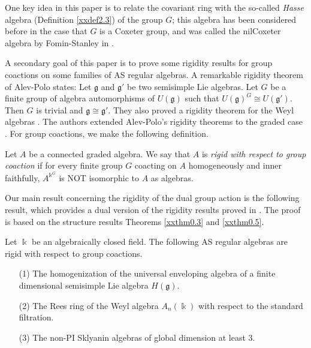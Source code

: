  One key idea in this paper is to relate
the covariant ring with the so-called {\it Hasse} algebra (Definition \ref{xxdef2.3})
of the group $G$; this algebra has been considered before in the case that $G$ is a Coxeter group, and was called the nilCoxeter algebra by Fomin-Stanley in \cite{FS}. 

A secondary goal of this paper is to prove some rigidity results
for group coactions on some families of AS regular 
algebras. A remarkable rigidity theorem of Alev-Polo \cite[Theorem 1]{AP}
states:
Let ${\mathfrak g}$ and ${\mathfrak g}'$ be two semisimple Lie algebras. Let $G$ be 
a finite group of algebra automorphisms of $U({\mathfrak g})$ such that 
$U({\mathfrak g})^G \cong  U({\mathfrak g}')$. Then $G$ is trivial and 
${\mathfrak g} \cong {\mathfrak g}'$.
They also proved a rigidity theorem for the Weyl algebras
\cite[Theorem 2]{AP}.
The authors extended Alev-Polo's rigidity theorems to the 
graded case \cite[Theorem 0.2 and Corollary 0.4]{KKZ1}. 
For group coactions, we make the following definition.

\begin{definition}
\label{xxdef0.8}
Let $A$ be a connected graded algebra. We say that $A$ is 
{\it rigid with respect to group coaction} if for every 
finite group $G$ coacting on $A$ homogeneously and inner
faithfully, $A^{\Bbbk^G}$ is NOT isomorphic to $A$ as algebras.
\end{definition}

Our main result concerning the rigidity of the dual group action is the following result, which provides
a dual version of the rigidity results proved in 
\cite[Theorem 0.2 and Corollary 0.4]{KKZ1}. The proof is based on the 
structure results Theorems \ref{xxthm0.3} and \ref{xxthm0.5}.

\begin{theorem}
\label{xxthm0.9}
Let $\Bbbk$ be an algebraically closed field. 
The following AS regular algebras are rigid with respect to 
group coactions.
\begin{enumerate}
\item[(1)]
The homogenization of the universal
enveloping algebra of a finite dimensional semisimple Lie algebra 
$H({\mathfrak g})$.
\item[(2)]
The Rees ring of the Weyl algebra $A_n(\Bbbk)$ with respect to the standard
filtration.
\item[(3)]
The non-PI Sklyanin algebras of global dimension at least 3.
\end{enumerate}
\end{theorem}

